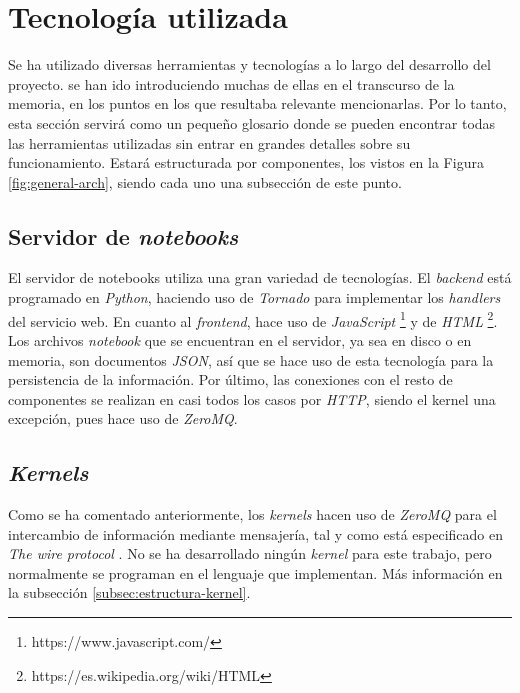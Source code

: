 \documentclass[11pt,spanish,listoffigures]{tfgetsinf}
\begin{document}

\section{Tecnología utilizada}
\label{sec:tecno-utilizada}

Se ha utilizado diversas herramientas y tecnologías a lo largo del desarrollo del proyecto. se han ido introduciendo muchas de ellas en el transcurso de la memoria, en los puntos en los que resultaba relevante mencionarlas. Por lo tanto, esta sección servirá como un pequeño glosario donde se pueden encontrar todas las herramientas utilizadas sin entrar en grandes detalles sobre su funcionamiento. Estará estructurada por componentes, los vistos en la Figura \ref{fig:general-arch}, siendo cada uno una subsección de este punto.


\subsection{Servidor de \textit{notebooks}}
\label{subsec:tecno-server}

El servidor de notebooks utiliza una gran variedad de tecnologías. El \textit{backend} está programado en \textit{Python}, haciendo uso de \textit{Tornado} para implementar los \textit{handlers} del servicio web. En cuanto al \textit{frontend}, hace uso de \textit{JavaScript} \footnote{https://www.javascript.com/} y de \textit{HTML} \footnote{https://es.wikipedia.org/wiki/HTML}. Los archivos \textit{notebook} que se encuentran en el servidor, ya sea en disco o en memoria, son documentos \textit{JSON}, así que se hace uso de esta tecnología para la persistencia de la información. Por último, las conexiones con el resto de componentes se realizan en casi todos los casos por \textit{HTTP}, siendo el kernel una excepción, pues hace uso de \textit{ZeroMQ}. 


\subsection{\textit{Kernels}}
\label{subsec:tecno-kernels}

Como se ha comentado anteriormente, los \textit{kernels} hacen uso de \textit{ZeroMQ} para el intercambio de información mediante mensajería, tal y como está especificado en \textit{The wire protocol} \cite{wire-protocol}. No se ha desarrollado ningún \textit{kernel} para este trabajo, pero normalmente se programan en el lenguaje que implementan. Más información en la subsección \ref{subsec:estructura-kernel}.
\end{document}
